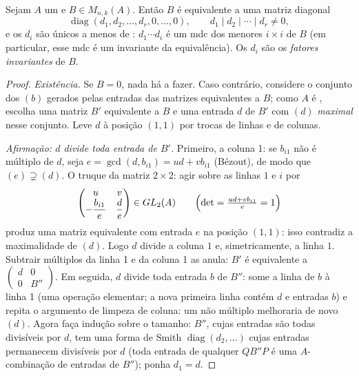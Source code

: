 \begin{theorem}\label{thm:b3:modules:smith}
Sejam $A$ um  e $B \in M_{n,k}(A)$. Então $B$ é equivalente a uma matriz
diagonal
\[
\operatorname{diag}(d_1, d_2, \dots, d_r, 0, \dots, 0),
\qquad d_1 \mid d_2 \mid \cdots \mid d_r \neq 0 ,
\]
e os $d_i$ são únicos a menos de : $d_1 \cdots d_i$ é um mdc dos
menores $i \times i$ de $B$ (em particular, esse mdc é um invariante da
equivalência). Os $d_i$ são os \emph{fatores
invariantes} de $B$.
\end{theorem}

\begin{proof}
\emph{Existência.} Se $B = 0$, nada há a fazer. Caso contrário,
considere o conjunto dos  $(b)$ gerados pelas entradas das
matrizes equivalentes a $B$; como $A$ é , escolha uma
matriz $B'$ equivalente a $B$ e uma entrada $d$ de $B'$
com $(d)$ \emph{maximal} nesse conjunto. Leve $d$ à posição
$(1,1)$ por trocas de linhas e de colunas.

\emph{Afirmação: $d$ divide toda entrada de $B'$.} Primeiro, a
coluna 1: se $b_{i1}$ não é múltiplo de $d$, seja $e = \gcd(d, b_{i1}) = ud +
vb_{i1}$
(Bézout), de modo que $(e) \supsetneq (d)$. O truque da matriz $2 \times 2$: agir sobre as
linhas $1$ e $i$ por
\[
\begin{pmatrix} u & v \\ -\dfrac{b_{i1}}e & \dfrac de
\end{pmatrix}
\in GL_2(A)
\qquad
\Bigl(\det = \tfrac{ud + v b_{i1}}e = 1\Bigr)
\]
produz uma matriz equivalente com entrada $e$ na posição
$(1,1)$: isso contradiz a maximalidade de $(d)$. Logo $d$
divide a coluna $1$ e, simetricamente, a linha $1$. Subtrair
múltiplos da linha 1 e da coluna 1 as anula: $B'$ é equivalente a
$\begin{pmatrix} d &
0\\ 0 & B''\end{pmatrix}$. Em seguida, $d$ divide toda entrada $b$ de $B''$:
some a linha de $b$ à linha 1 (uma operação elementar; a nova
primeira linha contém $d$ e entradas $b$) e repita o argumento
de limpeza de coluna: um não múltiplo melhoraria de novo $(d)$.
Agora faça indução sobre o tamanho: $B''$, cujas entradas são todas
divisíveis por $d$, tem uma forma de Smith $\operatorname{diag}(d_2,
\dots)$ cujas entradas
permanecem divisíveis por $d$ (toda entrada de qualquer $QB''P$
é uma $A$-combinação de entradas de $B''$); ponha $d_1 =
d$.


\end{proof}
